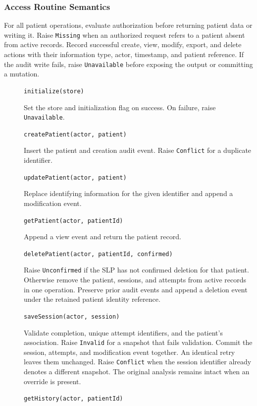 \documentclass[12pt, titlepage]{article}
\begin{document}
\subsubsection{Access Routine Semantics}
For all patient operations, evaluate authorization before returning patient
data or writing it. Raise \texttt{Missing} when an authorized request refers
to a patient absent from active records. Record successful create, view,
modify, export, and delete actions with their information type, actor,
timestamp, and patient reference. If the audit write fails, raise
\texttt{Unavailable} before exposing the output or committing a mutation.

\begin{description}
\item[] \texttt{initialize(store)}\par
Set the store and initialization flag on
success. On failure, raise \texttt{Unavailable}.
\item[] \texttt{createPatient(actor, patient)}\par
Insert the patient and creation
audit event. Raise \texttt{Conflict} for a duplicate identifier.
\item[] \texttt{updatePatient(actor, patient)}\par
Replace identifying information
for the given identifier and append a modification event.
\item[] \texttt{getPatient(actor, patientId)}\par
Append a view event and return the
patient record.
\item[] \texttt{deletePatient(actor, patientId, confirmed)}\par
Raise
\texttt{Unconfirmed} if the SLP has not confirmed deletion for that patient.
Otherwise remove the patient, sessions, and attempts from active records in
one operation. Preserve prior audit events and append a deletion event
under the retained patient identity reference.
\item[] \texttt{saveSession(actor, session)}\par
Validate completion, unique attempt
identifiers, and the patient's association. Raise \texttt{Invalid} for a
snapshot that fails validation. Commit the session, attempts, and modification
event together. An identical retry leaves them unchanged. Raise
\texttt{Conflict} when the session identifier already denotes a different
snapshot. The original analysis remains intact when an override is present.
\item[] \texttt{getHistory(actor, patientId)}\par

\end{description}
\end{document}
